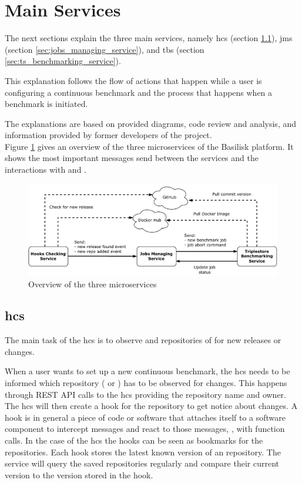 \section{Main Services}
\label{sec:main_services}
The next sections explain the three main services, namely \acl{hcs} (section \ref{sec:hooks_checking_service}), \acl{jms} (section \ref{sec:jobs_managing_service}), and \acl{tbs} (section \ref{sec:ts_benchmarking_service}).

This explanation follows the flow of actions that happen while a user is configuring a continuous benchmark and the process that happens when a benchmark is initiated.

The explanations are based on provided diagrams, code review and analysis, and information provided by former developers of the project.
\\

Figure \ref{fig:basilisk_high_level_design_approach} gives an overview of the three microservices of the Basilisk platform.
It shows the most important messages send between the services and the interactions with \gh{} and \dockh{}.
\begin{figure}[tbph]
	\centering
	\includegraphics[width=1\textwidth]{figures/high-level-design-approach.pdf}
	\caption{Overview of the three microservices}
	\label{fig:basilisk_high_level_design_approach}
\end{figure}



\subsection{\acl{hcs}}
\label{sec:hooks_checking_service}
The main task of the \ac{hcs} is to observe \gh{} and \dockh{} repositories of \tsp{} for new releases or changes.

When a user wants to set up a new continuous benchmark, the \ac{hcs} needs to be informed which repository (\gh{} or \dockh{}) has to be observed for changes.
This happens through REST API calls to the \ac{hcs} providing the repository name and owner.
The \ac{hcs} will then create a hook for the repository to get notice about changes.
A hook is in general a piece of code or software that attaches itself to a software component to intercept messages and react to those messages, \eg, with function calls.
In the case of the \ac{hcs} the hooks can be seen as bookmarks for the repositories.
Each hook stores the latest known version of an repository.
The service will query the saved repositories regularly and compare their current version to the version stored in the hook.

